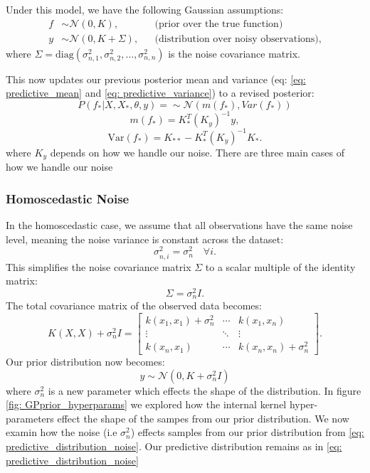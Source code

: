 \documentclass[11pt]{article}
\begin{document}
\bigskip

\noindent
Under this model, we have the following Gaussian assumptions:
\begin{align}
f &\sim \mathcal{N}(0, K), &&\text{(prior over the true function)} \\
y &\sim \mathcal{N}(0, K + \Sigma), &&\text{(distribution over noisy observations)},
\label{eq: prior_distribution_noise}
\end{align}
where \( \Sigma = \mathrm{diag}(\sigma_{n,1}^2, \sigma_{n,2}^2, \dots, \sigma_{n,n}^2) \) is the noise covariance matrix.

\bigskip
\noindent
This now updates our previous posterior mean and variance (eq: \ref{eq: predictive_mean} and \ref{eq: predictive_variance}) to a revised posterior:
\begin{equation}
    P(f_*|X,X_*,\theta,y) = \sim \mathcal{N}(m(f_*), Var(f_*))
    \label{eq: predictive_distribution_noise}
\end{equation}
\begin{equation}
m(f_*) = K_*^T (K_y)^{-1} y,
\label{eq: predictive_mean_noise}
\end{equation}
\begin{equation}
\text{Var}(f_*) = K_{**} - K_*^T (K_y)^{-1} K_*.
\label{eq: predictive_variance_noise}
\end{equation}
where \(K_y\) depends on how we handle our noise. There are three main cases of how we handle our noise

\subsubsection*{Homoscedastic Noise} 

In the homoscedastic case, we assume that all observations have the same noise level, meaning the noise variance is constant across the dataset:
\[
\sigma_{n,i}^2 = \sigma_n^2 \quad \forall i.
\]
This simplifies the noise covariance matrix \( \Sigma \) to a scalar multiple of the identity matrix:
\[
\Sigma = \sigma_n^2 I.
\]
The total covariance matrix of the observed data becomes:
\[
K(X, X) + \sigma_n^2 I = 
\begin{bmatrix}
k(x_1, x_1) + \sigma_n^2 & \cdots & k(x_1, x_n) \\
\vdots & \ddots & \vdots \\
k(x_n, x_1) & \cdots & k(x_n, x_n) + \sigma_n^2
\end{bmatrix}.
\]
Our prior distribution now becomes:
\begin{equation}
y \sim \mathcal{N}(0, K+\sigma_n^2 I)
\label{eq: prior_withnoise}
\end{equation}
where $\sigma_n^2$ is a new parameter which effects the shape of the distribution. In figure \ref{fig: GPprior_hyperparams} we 
explored how the internal kernel hyper-parameters effect the shape of the sampes from our prior distribution. We now examin how the noise (i.e $\sigma_n^2$) effects samples from our prior distribution from \ref{eq:  predictive_distribution_noise}.
Our predictive distribution remains as in \ref{eq: predictive_distribution_noise}
\end{document}
